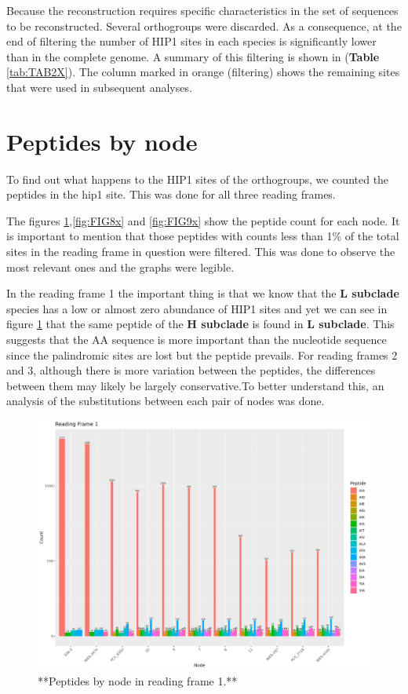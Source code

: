 \documentclass[
]{book}
\begin{document}
Because the reconstruction requires specific characteristics in the set of sequences to be reconstructed. Several orthogroups were discarded. As a consequence, at the end of filtering the number of HIP1 sites in each species is significantly lower than in the complete genome. A summary of this filtering is shown in (\textbf{Table} \ref{tab:TAB2X}). The column marked in orange (filtering) shows the remaining sites that were used in subsequent analyses.

\hypertarget{peptides-by-node-1}{%
\section{Peptides by node}\label{peptides-by-node-1}}

To find out what happens to the HIP1 sites of the orthogroups, we counted the peptides in the hip1 site. This was done for all three reading frames.

The figures \ref{fig:FIG7x},\ref{fig:FIG8x} and \ref{fig:FIG9x} show the peptide count for each node. It is important to mention that those peptides with counts less than 1\% of the total sites in the reading frame in question were filtered. This was done to observe the most relevant ones and the graphs were legible.

In the reading frame 1 the important thing is that we know that the \textbf{L subclade} species has a low or almost zero abundance of HIP1 sites and yet we can see in figure \ref{fig:FIG7x} that the same peptide of the \textbf{H subclade} is found in \textbf{L subclade}. This suggests that the AA sequence is more important than the nucleotide sequence since the palindromic sites are lost but the peptide prevails. For reading frames 2 and 3, although there is more variation between the peptides, the differences between them may likely be largely conservative.To better understand this, an analysis of the substitutions between each pair of nodes was done.

\begin{figure}
\includegraphics[width=1\linewidth]{figures/Peptides_RF1} \caption{**Peptides by node in reading frame 1.**}\label{fig:FIG7x}
\end{figure}
\end{document}
